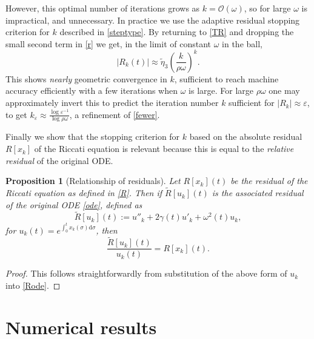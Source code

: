 \documentclass[10pt]{article}
\newcommand{\be}{\begin{equation}}
\newcommand{\ee}{\end{equation}}
\newcommand{\bigO}{{\mathcal O}}
\newtheorem{pro}[thm]{Proposition}
\newcommand{\om}{\omega}
\newcommand{\te}{\tilde\eta}
\begin{document}
However, this optimal number of iterations grows as $k = \bigO(\om)$,
so for large $\om$ is impractical, and unnecessary.
In practice we use the adaptive residual stopping criterion for $k$
described in \cref{steptype}.
By returning to \cref{TR} and dropping the small second term
in \cref{r} we get, in the limit of constant $\om$ in the ball,
$$
|R_k(t)|  \approx  \te_3 \left( \frac{k}{\rho\om}\right)^k.
$$
This shows \textit{nearly} geometric convergence in $k$,
sufficient to reach machine accuracy efficiently with a few iterations
when $\om$ is large.
For large $\rho\om$ one may approximately invert this to predict the iteration number $k$ sufficient for $|R_k| \approx \varepsilon$, to get
$ k_\varepsilon \approx \frac{\log \varepsilon^{-1}}{\log \rho\om}$,
a refinement of \cref{fewer}.

Finally we show that the stopping criterion for $k$ based on the absolute
residual $R[x_k]$ of the Riccati equation is relevant because this is equal
to the \emph{relative residual} of the original ODE.
\begin{pro}[Relationship of residuals]\label{residualu}
    Let $R[x_k](t)$ be the residual of the Riccati equation as defined in
    \cref{R}.
    Then if
    $\tilde{R}[u_k](t)$ is the associated residual of the original ODE
    \cref{ode}, defined as
    \be\label{Rode}
    \tilde{R}[u_k](t) := u''_k + 2\gamma(t)u'_k + \omega^2(t) u_k,
    \ee
    for $u_k(t) = e^{\int_0^t x_k(\sigma)\mathrm{d}\sigma}$, then
    \be
    \frac{\tilde{R}[u_k](t)}{u_k(t)} = R[x_k](t).
    \ee
\end{pro}
\begin{proof}
    This follows straightforwardly from substitution of the above form of $u_k$ into \cref{Rode}.
\end{proof}



\section{Numerical results \label{numresults}}

\end{document}

